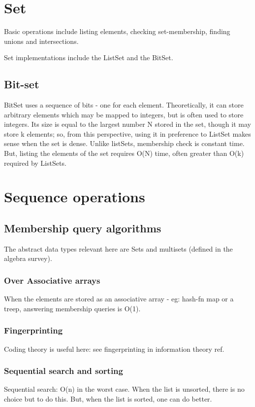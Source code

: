 \documentclass[oneside, article]{memoir}
\begin{document}
\chapter{Set}
Basic operations include listing elements, checking set-membership, finding unions and intersections.

Set implementations include the ListSet and the BitSet.

\section{Bit-set}
BitSet uses a sequence of bits - one for each element. Theoretically, it can store arbitrary elements which may be mapped to integers, but is often used to store integers. Its size is equal to the largest number N stored in the set, though it may store k elements; so, from this perspective, using it in preference to ListSet makes sense when the set is dense. Unlike listSets, membership check is constant time. But, listing the elements of the set requires O(N) time, often greater than O(k) required by ListSets.

\chapter{Sequence operations}
\section{Membership query algorithms}
The abstract data types relevant here are Sets and multisets (defined in the algebra survey).

\subsection{Over Associative arrays}
When the elements are stored as an associative array - eg: hash-fn map or a treep, answering membership queries is O(1).

\subsection{Fingerprinting}
Coding theory is useful here: see fingerprinting in information theory ref.

\subsection{Sequential search and sorting}
Sequential search: O(n) in the worst case. When the list is unsorted, there is no choice but to do this. But, when the list is sorted, one can do better.
\end{document}
